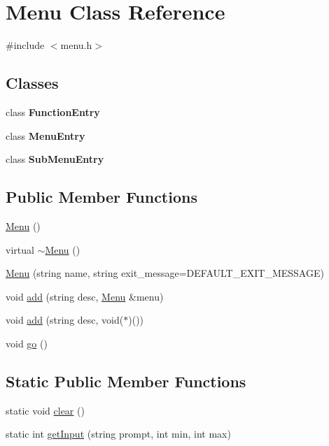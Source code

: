 \hypertarget{class_menu}{
\section{Menu Class Reference}
\label{class_menu}
}


{\ttfamily \#include $<$menu.h$>$}

\subsection*{Classes}
\begin{DoxyCompactItemize}
\item 
class {\bfseries FunctionEntry}
\item 
class {\bfseries MenuEntry}
\item 
class {\bfseries SubMenuEntry}
\end{DoxyCompactItemize}
\subsection*{Public Member Functions}
\begin{DoxyCompactItemize}
\item 
\hyperlink{class_menu_ad466dd83355124a6ed958430450bfe94}{Menu} ()
\item 
virtual \hyperlink{class_menu_a831387f51358cfb88cd018e1777bc980}{$\sim$Menu} ()
\item 
\hyperlink{class_menu_aad24c19d5035e0ca77ab2a5c395190e7}{Menu} (string name, string exit\_\-message=DEFAULT\_\-EXIT\_\-MESSAGE)
\item 
void \hyperlink{class_menu_af04218e98024058381ff8a4c2f9558e6}{add} (string desc, \hyperlink{class_menu}{Menu} \&menu)
\item 
void \hyperlink{class_menu_a7d04af3eab3b6a5805759dc234614611}{add} (string desc, void($\ast$)())
\item 
void \hyperlink{class_menu_a4ffdd38f7393883198e06c1048cc1bc6}{go} ()
\end{DoxyCompactItemize}
\subsection*{Static Public Member Functions}
\begin{DoxyCompactItemize}
\item 
static void \hyperlink{class_menu_a3630ce145aab68961ec535762d928558}{clear} ()
\item 
static int \hyperlink{class_menu_afb412ce39fb6878e82576cae2a551bba}{getInput} (string prompt, int min, int max)
\end{DoxyCompactItemize}



